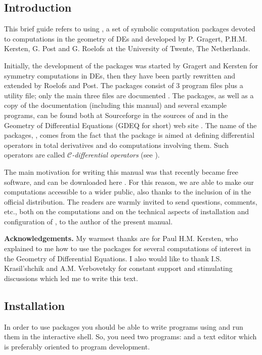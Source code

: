 \subsection{Introduction}

This brief guide refers to using \cdiff, a set of symbolic computation packages
devoted to computations in the geometry of DEs and developed by P. Gragert,
P.H.M. Kersten, G. Post and G. Roelofs at the University of Twente, The
Netherlands.

Initially, the development of the \cdiff packages was started by Gragert and
Kersten for symmetry computations in DEs, then they have been partly rewritten
and extended by Roelofs and Post. The \cdiff packages consist of 3 program
files plus a utility file; only the main three files are documented
\cite{svec,integ,tools}. The \cdiff packages, as well as a copy of the
documentation (including this manual) and several example programs, can be
found both at Sourceforge in the sources of \REDUCE \cite{red} and in the
Geometry of Differential Equations (GDEQ for short) web site \cite{gdeq}. The
name of the packages, \cdiff, comes from the fact that the package is aimed at
defining differential operators in total derivatives and do computations
involving them.  Such operators are called \emph{$\mathcal{C}$-differential
  operators} (see \cite{Many}).

The main motivation for writing this manual was that  recently became
free software, and can be downloaded here \cite{red}. For this reason, we are
able to make our computations accessible to a wider public, also thanks to the
inclusion of \cdiff in the official \REDUCE distribution. The readers are
warmly invited to send questions, comments, etc., both on the computations and
on the technical aspects of installation and configuration of \REDUCE, to the
author of the present manual.

\textbf{Acknowledgements.} My warmest thanks are for Paul H.M. Kersten, who
explained to me how to use the \cdiff packages for several computations of
interest in the Geometry of Differential Equations. I also would like to thank
I.S. Krasil'shchik and A.M. Verbovetsky for constant support and stimulating
discussions which led me to write this text.

\subsection{Installation}

In order to use \cdiff packages you should be able to write \REDUCE programs
using \cdiff and run them in the \REDUCE interactive shell. So, you need two
programs: \REDUCE and a text editor which is preferably oriented to program
development.

